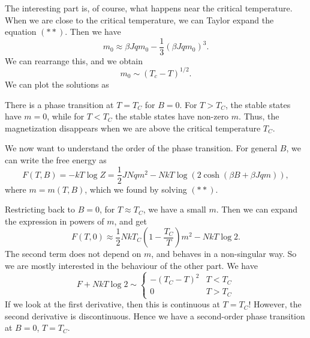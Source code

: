 \documentclass[a4paper]{article}
\begin{document}
The interesting part is, of course, what happens near the critical temperature. When we are close to the critical temperature, we can Taylor expand the equation $(**)$. Then we have
\[
  m_0 \approx \beta J q m_0 - \frac{1}{3} (\beta J q m_0)^3.
\]
We can rearrange this, and we obtain
\[
  m_0 \sim (T_c - T)^{1/2}.
\]
We can plot the solutions as
\begin{center}
\end{center}
There is a phase transition at $T = T_C$ for $B = 0$. For $T > T_C$, the stable states have $m = 0$, while for $T < T_C$ the stable states have non-zero $m$. Thus, the magnetization disappears when we are above the critical temperature $T_C$.

We now want to understand the order of the phase transition. For general $B$, we can write the free energy as
\[
  F(T, B) = -kT \log Z = \frac{1}{2} JNqm^2 - NkT \log\left(2 \cosh (\beta B + \beta J q m)\right),
\]
where $m = m(T, B)$, which we found by solving $(**)$.

Restricting back to $B = 0$, for $T \approx T_C$, we have a small $m$. Then we can expand the expression in powers of $m$, and get
\[
  F(T, 0) \approx \frac{1}{2} NkT_C \left(1 - \frac{T_C}{T}\right) m^2 - NkT \log 2.
\]
The second term does not depend on $m$, and behaves in a non-singular way. So we are mostly interested in the behaviour of the other part. We have
\[
  F + NkT \log 2 \sim
  \begin{cases}
    -(T_C - T)^2 & T < T_C\\
    0 & T > T_C
  \end{cases}
\]
If we look at the first derivative, then this is continuous at $T = T_C$! However, the second derivative is discontinuous. Hence we have a second-order phase transition at $B = 0$, $T = T_C$.
\end{document}
